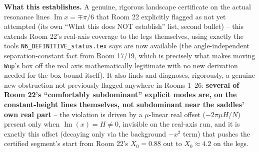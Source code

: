\documentclass[11pt]{article}
\begin{document}
\textbf{What this establishes.} A genuine, rigorous landscape certificate on the actual resonance lines
$\operatorname{Im}x=\mp\pi/6$ that Room 22 explicitly flagged as not yet attempted (its own ``What this
does NOT establish'' list, second bullet) -- this extends Room 22's real-axis coverage to the legs
themselves, using exactly the tools \texttt{N6\_DEFINITIVE\_status.tex} says are now available (the
angle-independent separation-constant fact from Room 17/19, which is precisely what makes moving
\texttt{Wup}'s box off the real axis mathematically legitimate with no new derivation needed for the box
bound itself). It also finds and diagnoses, rigorously, a genuine new obstruction not previously flagged
anywhere in Rooms 1--26: \textbf{several of Room 22's ``comfortably subdominant'' explicit modes are, on
the constant-height lines themselves, not subdominant near the saddles' own real part} -- the violation
is driven by a $\mu$-linear real offset ($-2\pi\mu H/N$) present only when $\operatorname{Im}(x)=H\ne0$,
invisible on the real-axis run, and it is exactly this offset (decaying only via the background $-x^2$
term) that pushes the certified segment's start from Room 22's $X_0=0.88$ out to $X_0\approx4.2$ on the
legs.
\end{document}

